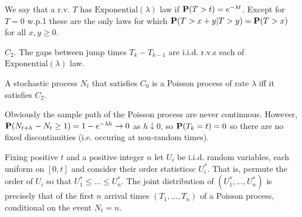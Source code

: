 \begin{proposition*}
We say that a r.v. $T$ has $\text{Exponential}(\lambda)$ law if $\mathbf{P}(T>t)=e^{-\lambda t}$. Except for $T=0$ w.p.1 these are the only laws for which $\mathbf{P}(T>x+y|T>y)=\mathbf{P}(T>x)$ for all $x,y\geq0$.
\end{proposition*}

\begin{condition*}
$\boxed{C_2}$. The gaps between jump times $T_k-T_{k-1}$ are i.i.d. r.v.s each of $\text{Exponential}(\lambda)$ law.
\end{condition*}

\begin{proposition*}
A stochastic process $N_t$ that satisfies $\boxed{C_0}$ is a Poisson process of rate $\lambda$ iff it satisfies $\boxed{C_2}$.
\end{proposition*}

\begin{remark*}
Obviously the sample path of the Poisson process are never continuous. However, $\mathbf{P}(N_{t+h} - N_t \geq 1) = 1-e^{-\lambda h} \to 0$ as $h \downarrow 0$, so $\mathbf{P}(T_k=t)=0$ so there are no fixed discontinuities (i.e. occuring at non-random times).
\end{remark*}

\begin{proposition*}
Fixing positive $t$ and a positive integer $n$ let $U_i$ be i.i.d. random variables, each uniform on $[0,t]$ and consider their order statisticsc $U_i^*$. That is, permute the order of $U_i$ so that $U_1^*\leq\dots\leq U_n^*$. The joint distribution of $(U_1^*,\dots,U_n^*)$ is precisely that of the first $n$ arrival times $(T_1,\dots,T_n)$ of a Poisson process, conditional on the event $N_t=n$.
\end{proposition*}

